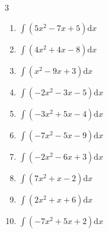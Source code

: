 \begin{multicols}{3}
\begin{enumerate}

\columnbreak %

  \item $\displaystyle \int \left( 5x^{2}-7x+5 \right) \mathrm{d}x$


  \item $\displaystyle \int \left( 4x^{2}+4x-8 \right) \mathrm{d}x$


  \item $\displaystyle \int \left( x^{2}-9x+3 \right) \mathrm{d}x$


  \item $\displaystyle \int \left( -2x^{2}-3x-5 \right) \mathrm{d}x$


  \item $\displaystyle \int \left( -3x^{2}+5x-4 \right) \mathrm{d}x$


  \item $\displaystyle \int \left( -7x^{2}-5x-9 \right) \mathrm{d}x$


  \item $\displaystyle \int \left( -2x^{2}-6x+3 \right) \mathrm{d}x$


  \item $\displaystyle \int \left( 7x^{2}+x-2 \right) \mathrm{d}x$


  \item $\displaystyle \int \left( 2x^{2}+x+6 \right) \mathrm{d}x$


  \item $\displaystyle \int \left( -7x^{2}+5x+2 \right) \mathrm{d}x$


\end{enumerate}
\end{multicols}

